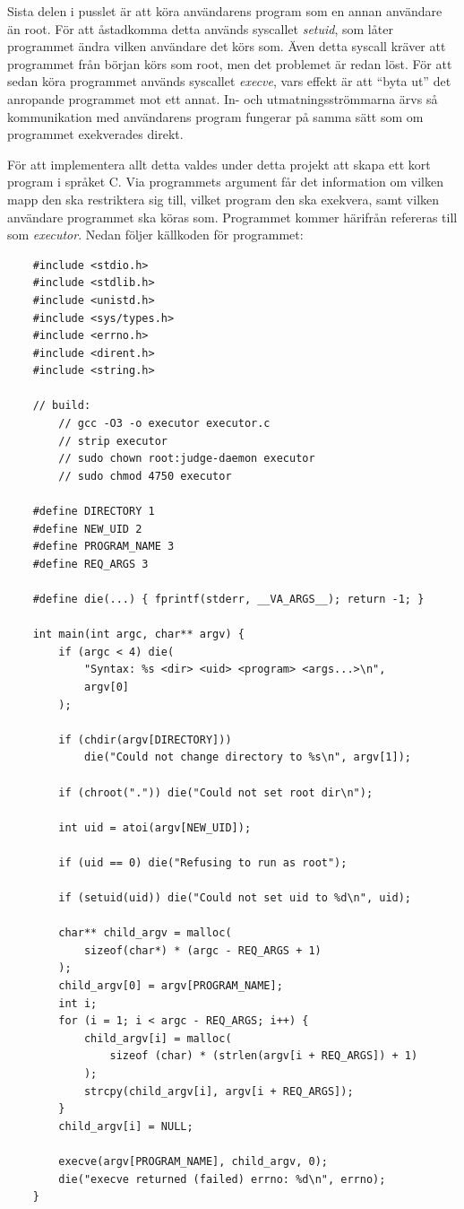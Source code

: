 \documentclass{article}
\begin{document}
Sista delen i pusslet är att köra användarens program som en annan användare än
root. För att åstadkomma detta används syscallet \textit{setuid}, som låter
programmet ändra vilken användare det körs som. Även detta syscall kräver att
programmet från början körs som root, men det problemet är redan löst. För att
sedan köra programmet används syscallet \textit{execve}, vars effekt är att
``byta ut'' det anropande programmet mot ett annat. In- och utmatningsströmmarna
ärvs så kommunikation med användarens program fungerar på samma sätt som om
programmet exekverades direkt.

\hypertarget{executor}{}
\label{executor}

För att implementera allt detta valdes under detta projekt att skapa ett kort
program i språket C. Via programmets argument får det information om vilken mapp
den ska restriktera sig till, vilket program den ska exekvera, samt vilken
användare programmet ska köras som. Programmet kommer härifrån refereras till
som \textit{executor}. Nedan följer källkoden för programmet:

\begin{verbatim}
	#include <stdio.h>
	#include <stdlib.h>
	#include <unistd.h>
	#include <sys/types.h>
	#include <errno.h>
	#include <dirent.h>
	#include <string.h>

	// build:
		// gcc -O3 -o executor executor.c
		// strip executor
		// sudo chown root:judge-daemon executor
		// sudo chmod 4750 executor

	#define DIRECTORY 1
	#define NEW_UID 2
	#define PROGRAM_NAME 3
	#define REQ_ARGS 3

	#define die(...) { fprintf(stderr, __VA_ARGS__); return -1; }

	int main(int argc, char** argv) {
		if (argc < 4) die(
			"Syntax: %s <dir> <uid> <program> <args...>\n",
			argv[0]
		);

		if (chdir(argv[DIRECTORY]))
			die("Could not change directory to %s\n", argv[1]);

		if (chroot(".")) die("Could not set root dir\n");

		int uid = atoi(argv[NEW_UID]);

		if (uid == 0) die("Refusing to run as root");

		if (setuid(uid)) die("Could not set uid to %d\n", uid);

		char** child_argv = malloc(
			sizeof(char*) * (argc - REQ_ARGS + 1)
		);
		child_argv[0] = argv[PROGRAM_NAME];
		int i;
		for (i = 1; i < argc - REQ_ARGS; i++) {
			child_argv[i] = malloc(
				sizeof (char) * (strlen(argv[i + REQ_ARGS]) + 1)
			);
			strcpy(child_argv[i], argv[i + REQ_ARGS]);
		}
		child_argv[i] = NULL;

		execve(argv[PROGRAM_NAME], child_argv, 0);
		die("execve returned (failed) errno: %d\n", errno);
	}
\end{verbatim}
\end{document}
